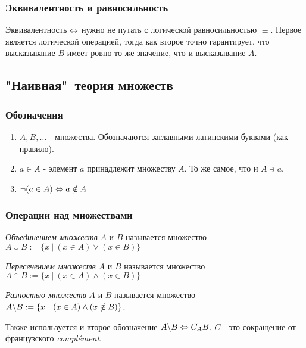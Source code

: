 \subsubsection*{Эквивалентность и равносильность}

Эквивалентность $\Leftrightarrow$ нужно не путать с логической равносильностью $\equiv$. Первое является логической операцией, тогда как второе точно гарантирует, что высказывание $B$ имеет ровно то же значение, что и высказывание $A$.


\subsection{"Наивная"\ теория множеств}

\subsubsection*{Обозначения}

\begin{enumerate}
    \item $A, B, \dots$ - множества. Обозначаются заглавными латинскими буквами (как правило).
    \item $a \in A$ - элемент $a$ принадлежит множеству $A$. То же самое, что и $A \ni a$.
    \item $\neg (a \in A) \Leftrightarrow a \notin A$
\end{enumerate}


\subsubsection*{Операции над множествами}

\begin{definition}
    \textit{Объединением множеств} $A$ и $B$ называется множество $A \cup B := \{x\ |\ (x \in A) \vee (x \in B)\}$
\end{definition}

\begin{definition}
    \textit{Пересечением множеств} $A$ и $B$ называется множество $A \cap B := \{x\ |\ (x \in A) \wedge (x \in B)\}$
\end{definition}

\begin{definition}
    \textit{Разностью множеств} $A$ и $B$ называется множество $A \backslash B := \{x\ |\ (x \in A) \wedge (x \notin B)\}$.
    
    Также используется и второе обозначение $A \backslash B \Leftrightarrow C_A B$. $C$ - это сокращение от французского \textit{complément}.
\end{definition}

